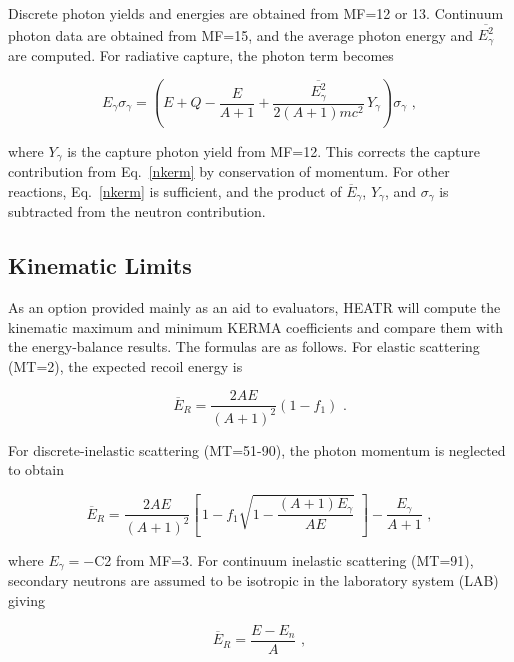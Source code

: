Discrete photon yields and energies are obtained from
MF=12 or 13.  Continuum photon data are obtained from MF=15,
and the average photon energy and $\overline{E_\gamma^2}$ are
computed.  For radiative capture, the photon term becomes

\begin{equation}
   E_\gamma\sigma_\gamma=\left(E+Q-\frac{E}{A+1}
    +\frac{\overline{E_\gamma^2}}{2(A+1)mc^2}\,Y_\gamma\right)
    \sigma_\gamma\,\,,
\label{cfix}
\end{equation}

\noindent
\cite{ENDF102}
where $Y_\gamma$ is the capture photon yield from MF=12.  This
corrects the capture contribution from Eq.~\ref{nkerm} by
conservation of momentum.  For other reactions,
Eq.~\ref{nkerm} is sufficient, and the product of
$\overline{E}_\gamma$, $Y_\gamma$, and $\sigma_\gamma$ is
subtracted from the neutron contribution.


\subsection{Kinematic Limits}
\label{ssHEATR_kinematiclimits}

As an option provided  mainly as an aid to evaluators, HEATR
will compute the kinematic maximum and minimum KERMA
 coefficients and compare them with the
energy-balance results.  The formulas are as follows.  For
elastic scattering (MT=2), the expected recoil energy is

\begin{equation}
   \overline{E}_R=\frac{2AE}{(A+1)^2}(1-f_1)\,\,.
\end{equation}

For discrete-inelastic scattering (MT=51-90), the photon
momentum is neglected to obtain

\begin{equation}
   \overline{E}_R=\frac{2AE}{(A+1)^2}\left[\,1-
    f_1\sqrt{1-\frac{(A+1)E_\gamma}{AE}}\,\,\right]
    -\frac{E_\gamma}{A+1}\,\,,
\label{disc}
\end{equation}

\noindent
where $E_\gamma{=}-$C2 from MF=3.  For continuum inelastic
scattering (MT=91), secondary neutrons are assumed to be
isotropic in the laboratory system (LAB) giving

\begin{equation}
   \overline{E}_R=\frac{E-E_n}{A}\,\,,
\label{contin}
\end{equation}

